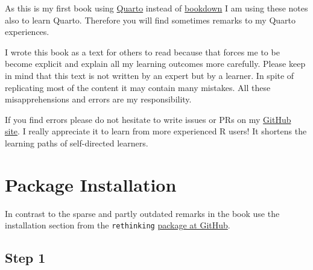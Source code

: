 \documentclass[
  letterpaper,
  DIV=11,
  numbers=noendperiod]{scrreprt}
\begin{document}
As this is my first book using \href{https://quarto.org/}{Quarto}
instead of \href{https://bookdown.org/yihui/bookdown/}{bookdown} I am
using these notes also to learn Quarto. Therefore you will find
sometimes remarks to my Quarto experiences.

\begin{tcolorbox}[enhanced jigsaw, colframe=quarto-callout-note-color-frame, colback=white, toprule=.15mm, breakable, arc=.35mm, bottomtitle=1mm, colbacktitle=quarto-callout-note-color!10!white, toptitle=1mm, titlerule=0mm, title=\textcolor{quarto-callout-note-color}{\faInfo}\hspace{0.5em}{Warning}, leftrule=.75mm, opacityback=0, rightrule=.15mm, opacitybacktitle=0.6, bottomrule=.15mm, left=2mm, coltitle=black]

I wrote this book as a text for others to read because that forces me to
be become explicit and explain all my learning outcomes more carefully.
Please keep in mind that this text is not written by an expert but by a
learner. In spite of replicating most of the content it may contain many
mistakes. All these misapprehensions and errors are my responsibility.

\end{tcolorbox}

If you find errors please do not hesitate to write issues or PRs on my
\href{https://github.com/petzi53/statistical-rethinking-2-2023}{GitHub
site}. I really appreciate it to learn from more experienced R users! It
shortens the learning paths of self-directed learners.

\hypertarget{package-installation}{%
\section*{Package Installation}\label{package-installation}}


In contrast to the sparse and partly outdated remarks in the book use
the installation section from the \texttt{rethinking}
\href{https://github.com/rmcelreath/rethinking\#installation}{package at
GitHub}.

\hypertarget{step-1}{%
\subsection*{Step 1}\label{step-1}}
\end{document}
